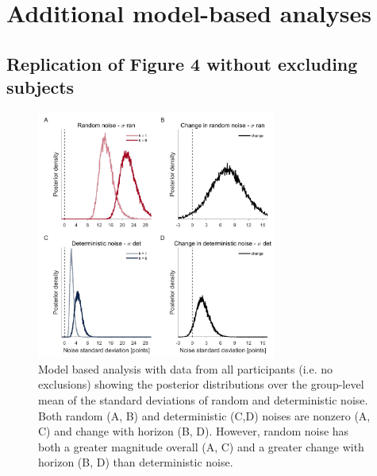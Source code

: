 \documentclass[12pt]{article}
\begin{document}
	\section{Additional model-based analyses}
	\subsection{Replication of Figure 4 without excluding subjects}
	\begin{figure}[H]
		\begin{center}
			\includegraphics[width=0.7\textwidth]{figures/RDBayes_hyperprior__all.jpg}
			\caption{Model based analysis with data from all participants (i.e. no exclusions) showing the posterior distributions over the group-level mean of the standard deviations of  random and deterministic noise. Both random (A, B) and deterministic (C,D) noises are nonzero (A, C) and change with horizon (B, D).  However, random noise has both a greater magnitude overall (A, C) and a greater change with horizon (B, D) than deterministic noise.}
			\label{fig:s8}
		\end{center}
	\end{figure}
	\newpage
\end{document}
